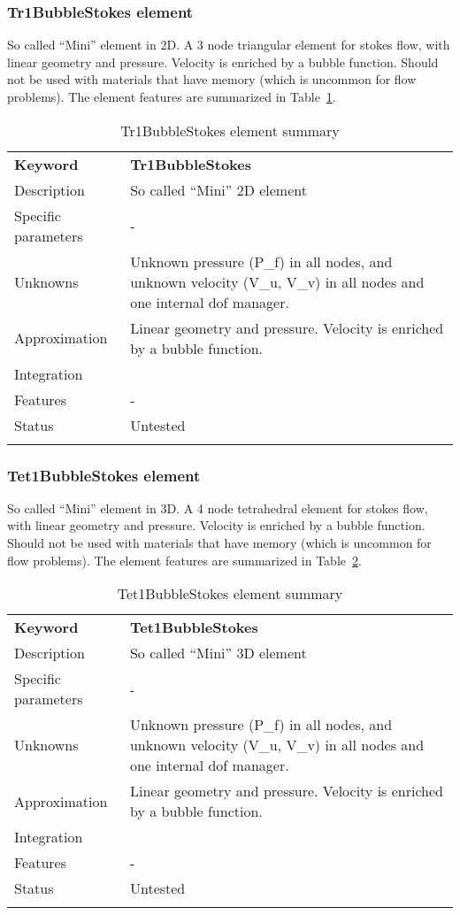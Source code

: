 \documentclass[a4paper]{article}
\newcommand{\param}[1]{\texttt{#1}} %
\newcommand{\templabel}{}%
\newcommand{\tempcaption}{}%
\newcounter{nelpar}
\newenvironment{elementsummary}[5]{%
  \gdef\tempcaption{#4}%
  \gdef\templabel{#5}%
  \setcounter{nelpar}{0}%
  \begin{center} %
    \begin{table}[!htb] %
      \begin{tabular}{|l|p{9cm}|}\hline %
        {\bf Keyword} & \bf{#1}\\ %
        {Description} & {#2}\\ %
        {Specific parameters} & {#3}\\ \hline %
}{
  \\ \hline %
      \end{tabular}%
      \caption{\tempcaption}%
      \label{\templabel}%
    \end{table}%
  \end{center}%
}
\newcommand{\elementParam}[1]{%
  \ifthenelse{\value{nelpar}>0} %
             {&{#1}}%
             {\setcounter{nelpar}{1}Parameters&{#1}}%
             \\%
}
\newcommand{\elementDescription}[2]{{#1} & {#2}\\ }
\begin{document}
\subsubsection{Tr1BubbleStokes element}
So called ``Mini'' element in 2D. A 3 node triangular element for stokes flow, with linear geometry and pressure. Velocity is enriched by a bubble function.
Should not be used with materials that have memory (which is uncommon for flow problems). The element features are summarized in Table~\ref{Tr1BubbleStokessummary}.

\begin{elementsummary}{Tr1BubbleStokes}{So called ``Mini'' 2D element}{-}{Tr1BubbleStokes element summary}{Tr1BubbleStokessummary}
\elementDescription{Unknowns}{Unknown pressure (P\_f) in all nodes, and unknown velocity (V\_u, V\_v) in all nodes and one internal dof manager.}
\elementDescription{Approximation}{Linear geometry and pressure. Velocity is enriched by a bubble function.}
\elementDescription{Integration}{}
\elementDescription{Features}{-}
\elementDescription{Status}{Untested}
\end{elementsummary}

\subsubsection{Tet1BubbleStokes element}
So called ``Mini'' element in 3D. A 4 node tetrahedral element for stokes flow, with linear geometry and pressure. Velocity is enriched by a bubble function.
Should not be used with materials that have memory (which is uncommon for flow problems). The element features are summarized in Table~\ref{Tet1BubbleStokessummary}.

\begin{elementsummary}{Tet1BubbleStokes}{So called ``Mini'' 3D element}{-}{Tet1BubbleStokes element summary}{Tet1BubbleStokessummary}
\elementDescription{Unknowns}{Unknown pressure (P\_f) in all nodes, and unknown velocity (V\_u, V\_v) in all nodes and one internal dof manager.}
\elementDescription{Approximation}{Linear geometry and pressure. Velocity is enriched by a bubble function.}
\elementDescription{Integration}{}
\elementDescription{Features}{-}
\elementDescription{Status}{Untested}
\end{elementsummary}
\end{document}
